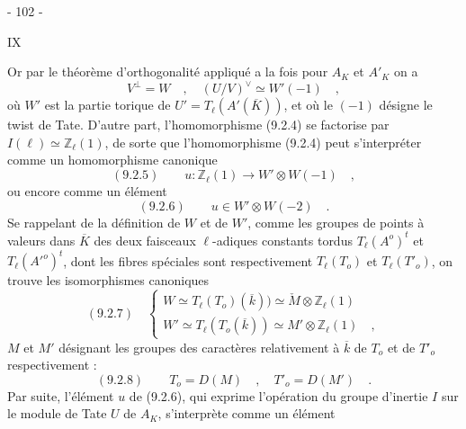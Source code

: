 \begin{center}- 102 -\end{center}\hfill IX

Or par le théorème d'orthogonalité appliqué a la fois pour $A_K$ et $A'_K$ on a
\[
V^\perp=W\quad,\quad(U/V)^\vee\simeq W'(-1)\quad,
\]
où $W'$ est la partie torique de $U'=T_\ell(A'(\overline K))$, et où le $(-1)$ désigne le twist de Tate. D'autre part, l'homomorphisme (9.2.4) se factorise par $I(\ell)\simeq\mathbb Z_\ell(1)$, de sorte que l'homomorphisme (9.2.4) peut s'interpréter comme un homomorphisme canonique
\[
(9.2.5)\qquad u:\mathbb Z_\ell(1)\longrightarrow W'\otimes W(-1)\quad,
\]
ou encore comme un élément
\[
(9.2.6)\qquad u\in W'\otimes W(-2)\quad.
\]
Se rappelant de la définition de $W$ et de $W'$, comme les groupes de points à valeurs dans $\overline K$ des deux faisceaux $\ell$-adiques constants tordus $T_\ell(A^o)^t$ et $T_\ell(A'^o)^t$, dont les fibres spéciales sont respectivement $T_\ell(T_o)$ et $T_\ell(T'_o)$, on trouve les isomorphismes canoniques
\[
(9.2.7)\quad\left\{\begin{array}{l}
W\simeq T_\ell(T_o)(\overline k))\simeq\check M\otimes\mathbb Z_\ell(1)\\[1.5ex]
W'\simeq T_\ell(T_o(\overline k))\simeq M'\otimes\mathbb Z_\ell(1)\quad,
\end{array}\right.
\]
$M$ et $M'$ désignant les groupes des caractères relativement à $\overline k$ de $T_o$ et de $T'_o$ respectivement :
\[
(9.2.8)\qquad T_o=D(M)\quad,\quad T'_o=D(M')\quad.
\]
Par suite, l'élément $u$ de (9.2.6), qui exprime l'opération du groupe d'inertie $I$ sur le module de Tate $U$ de $A_K$, s'interprète comme un élément

